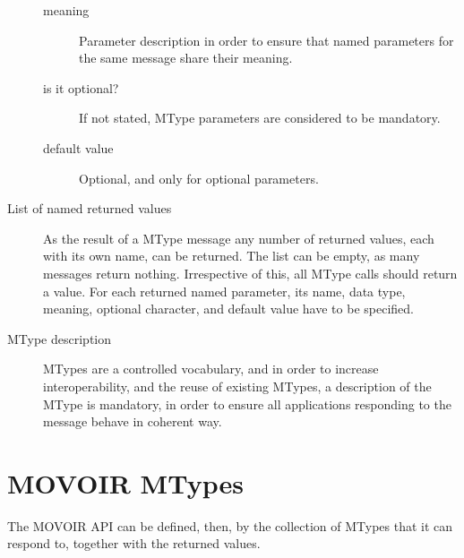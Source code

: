 \begin{description}
\begin{description}
				\item[meaning] Parameter description in order to
				ensure that named parameters for the same message
				share their meaning.
				
				\item[is it optional?] If not stated, MType
				parameters are considered to be mandatory.
				
				\item[default value] Optional, and only for
				optional parameters.
			\end{description}
			
			
			 \item[List of named returned values] As the result of a
			MType message any number of returned values, each with
			its own name, can be returned. The list can be empty, as
			many messages return nothing. Irrespective of this, all
			MType calls should return a value. For each returned
			named parameter, its name, data type, meaning, optional
			character, and default value have to be specified.
			
			 \item[MType description] MTypes are a controlled
			vocabulary, and in order to increase interoperability,
			and the reuse of existing MTypes, a description of the
			MType is mandatory, in order to ensure all applications
			responding to the message behave in coherent way.
		\end{description}
		
		
	
	\section{MOVOIR MTypes} %
	\label{sec:movoir_mtypes}
	
		The MOVOIR API can be defined, then, by the collection of
		MTypes that it can respond to, together with the returned
		values.
		
